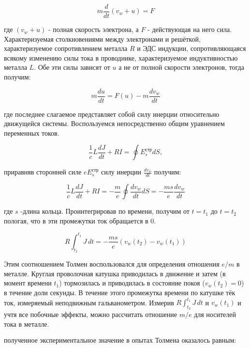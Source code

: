 \documentclass{lab}
\begin{document}
\begin{equation}
	m \frac{d}{dt} (v_{w} + u) = F
\end{equation}

где $(v_{w} + u)$ - полная скорость электрона, а $F$ - действующая на него сила. Характеризуемая столкновениями между электронами и решёткой, характеризуемое сопротивлением металла $R$ и ЭДС индукции, сопротивляющаяся всякому изменению силы тока в проводнике, характеризуемое индуктивностью металла $L$. Обе эти силы зависят от $u$ а не от полной скорости электронов, тогда получим:

\begin{equation}
	m \frac{du}{dt}  = F(u) - m \frac{dv_{w}}{dt}
\end{equation}

где последнее слагаемое представляет собой силу инерции относительно движущейся системы. Воспользуемся непосредственно общим уравнением переменных токов.

\begin{equation}
	\frac{1}{c}L\frac{dJ}{dt} +RI  = \oint{E^{\text{стр}}_{s}}dS,
\end{equation}

приравняв сторонней силе $ eE^{\text{стр}}_{s}$ силу инерции $\frac{dv_{w}}{dt}$ получим:

\begin{equation}
	\frac{1}{c}L\frac{dJ}{dt} +RI  = - \frac{m}{e} \oint{\frac{dv_{w}}{dt}}dS = - \frac{ms}{e} \frac{dv_{w}}{dt}
\end{equation}

где $s$ -длина кольца. Проинтегрировав по времени, получим от $t = t_1$ до $t = t_2$ пологая, что в эти промежутки ток обращается в 0.

\begin{equation}
	R\int_{t_2}^{t_1} J \,dt = - \frac{ms}{e} (v_{w}(t_2) - v_{w}(t_1))
\end{equation}

Этим соотношением Толмен воспользовался для определения отношения $e/m$ в металле. Круглая проволочная катушка приводилась в движение и затем (в момент времени $t_1$) тормозилась и приводилась в состояние покоя ($v_{w}(t_2) = 0$) в течение доли секунды. В течение этого промежутка времени по катушке тёк ток, измеряемый неподвижным гальванометром. Измерив $R\int_{t_2}^{t_1} J \,dt$ и $v_{w}(t_1)$ и учтя все побочные эффекты, можно рассчитать отношение $m/e$ для носителей тока в металле.

полученное экспериментальное значение в опытах Толмена оказалось равным:
\end{document}
